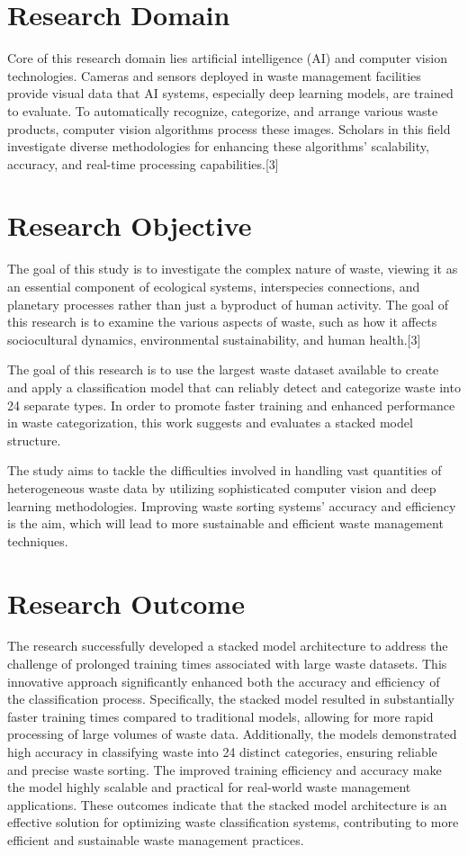 \section{Research Domain}
Core of this research domain lies artificial intelligence (AI) and computer vision technologies. Cameras and sensors deployed in waste management facilities provide visual data that AI systems, especially deep learning models, are trained to evaluate. To automatically recognize, categorize, and arrange various waste products, computer vision algorithms process these images. Scholars in this field investigate diverse methodologies for enhancing these algorithms' scalability, accuracy, and real-time processing capabilities.[3]

\section{Research Objective}
The goal of this study is to investigate the complex nature of waste, viewing it as an essential component of ecological systems, interspecies connections, and planetary processes rather than just a byproduct of human activity. The goal of this research is to examine the various aspects of waste, such as how it affects sociocultural dynamics, environmental sustainability, and human health.[3]

The goal of this research is to use the largest waste dataset available to create and apply a classification model that can reliably detect and categorize waste into 24 separate types. In order to promote faster training and enhanced performance in waste categorization, this work suggests and evaluates a stacked model structure.

The study aims to tackle the difficulties involved in handling vast quantities of heterogeneous waste data by utilizing sophisticated computer vision and deep learning methodologies. Improving waste sorting systems' accuracy and efficiency is the aim, which will lead to more sustainable and efficient waste management techniques.

\section{Research Outcome}
The research successfully developed a stacked model architecture to address the challenge of prolonged training times associated with large waste datasets. This innovative approach significantly enhanced both the accuracy and efficiency of the classification process. Specifically, the stacked model resulted in substantially faster training times compared to traditional models, allowing for more rapid processing of large volumes of waste data. Additionally, the models demonstrated high accuracy in classifying waste into 24 distinct categories, ensuring reliable and precise waste sorting. The improved training efficiency and accuracy make the model highly scalable and practical for real-world waste management applications. These outcomes indicate that the stacked model architecture is an effective solution for optimizing waste classification systems, contributing to more efficient and sustainable waste management practices.

